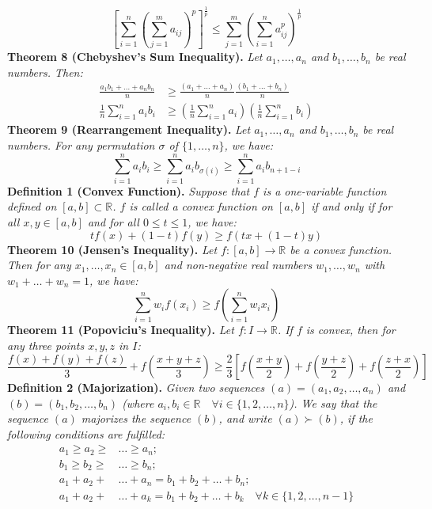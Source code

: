 \documentclass[a4paper,11pt]{article}
\begin{document}
\[
\left[ \sum_{i=1}^n \left( \sum_{j=1}^m a_{ij} \right)^p \right]^\frac{1}{p} \leq \sum_{j=1}^m \left( \sum_{i=1}^n a_{ij}^p \right)^\frac{1}{p} 
\]
%
%
\textbf{Theorem 8 (Chebyshev's Sum Inequality).} \textit{Let $a_1, \dots, a_n$ and $b_1, \dots, b_n$ be real numbers. Then:}
\begin{align*}
    \frac{a_1b_1 + \dots + a_nb_n}{n} &\geq \frac{(a_1 + \dots + a_n)}{n} \frac{(b_1 + \dots + b_n)}{n} \\
    \frac{1}{n} \sum_{i=1}^n a_ib_i &\geq \left( \frac{1}{n} \sum_{i=1}^n a_i \right) \left( \frac{1}{n} \sum_{i=1}^n b_i \right)
\end{align*}
%
%
\textbf{Theorem 9 (Rearrangement Inequality).} \textit{Let $a_1, \dots, a_n$ and $b_1, \dots, b_n$ be real numbers. For any permutation $\sigma$ of $\{1, \dots, n\}$, we have:}
\[
\sum_{i=1}^n a_ib_i \geq \sum_{i=1}^n a_ib_{\sigma(i)} \geq \sum_{i=1}^n a_ib_{n+1-i}
\]
%
%
\textbf{Definition 1 (Convex Function).} \textit{Suppose that $f$ is a one-variable function defined on $[a, b] \subset \mathbb{R}$. $f$ is called a convex function on $[a, b]$ if and only if for all $x, y \in [a, b]$ and for all $0 \leq t \leq 1$, we have:}
\[
tf(x) + (1 - t)f(y) \geq f(tx + (1-t)y)
\]
%
%
\textbf{Theorem 10 (Jensen’s Inequality).} \textit{Let $f: [a, b] \to \mathbb{R}$ be a convex function. Then for any $x_1, \dots, x_n \in [a, b]$ and non-negative real numbers $w_1, \dots, w_n$ with $w_1 + \dots + w_n = 1$, we have:}
\[
\sum_{i=1}^n w_i f(x_i) \geq f( \sum_{i=1}^n w_i x_i )
\]
%
%
\textbf{Theorem 11 (Popoviciu's Inequality).} \textit{Let $f: I \to \mathbb{R}$. If $f$ is convex, then for any three points $x, y, z$ in $I$:}
\[
\frac{f(x) + f(y) + f(z)}{3} + f\left(\frac{x + y + z}{3} \right) \geq \frac{2}{3} \left[ f\left( \frac{x + y}{2} \right) + f\left( \frac{y + z}{2} \right) + f\left( \frac{z + x}{2} \right) \right]
\]
%
%
\textbf{Definition 2 (Majorization).} \textit{Given two sequences $(a) = (a_1, a_2, \dots, a_n)$ and  $(b) = (b_1, b_2, \dots, b_n)$ (where $a_i, b_i \in \mathbb{R} \quad \forall i \in \{ 1, 2, \dots, n \}$). We say that the sequence $(a)$ majorizes the sequence $(b)$, and write $(a) \succ (b)$, if the following conditions are fulfilled:}
\begin{align*}
    a_1 \geq a_2 \geq &\dots \geq a_n; \\
    b_1 \geq b_2 \geq &\dots \geq b_n; \\
    a_1 + a_2 + &\dots + a_n = b_1 + b_2 + \dots + b_n; \\
    a_1 + a_2 + &\dots + a_k = b_1 + b_2 + \dots + b_k \quad \forall k \in \{ 1, 2, \dots, n-1 \} \\
\end{align*}
\end{document}
